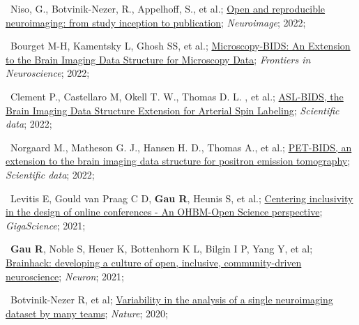 

\textbullet~Niso, G., Botvinik-Nezer, R., Appelhoff, S., et al.;
\href{https://doi.org/10.1016/j.neuroimage.2022.119623}
{Open and reproducible neuroimaging: from study inception to publication};
\textit{Neuroimage};
2022;

\textbullet~Bourget M-H, Kamentsky L, Ghosh SS, et al.;
\href{https://doi.org/10.3389/fnins.2022.871228}
{Microscopy-BIDS: An Extension to the Brain Imaging Data Structure for Microscopy Data};
\textit{Frontiers in Neuroscience};
2022;
\newline
{}

\textbullet~Clement P., Castellaro M, Okell T. W., Thomas D. L. , et al.;
\href{https://doi.org/10.1038/s41597-022-01615-9}
{ASL-BIDS, the Brain Imaging Data Structure Extension for Arterial Spin Labeling};
\textit{Scientific data};
2022;

\textbullet~Norgaard M., Matheson G. J., Hansen H. D., Thomas A., et al.;
\href{https://doi.org/10.1038/s41597-022-01164-1}
{PET-BIDS, an extension to the brain imaging data structure for positron emission tomography};
\textit{Scientific data};
2022;

\textbullet~Levitis E, Gould van Praag C D, \textbf{Gau R}, Heunis S, et al.;
\href{https://doi.org/10.1093/gigascience/giab051}
{Centering inclusivity in the design of online conferences - An OHBM-Open Science perspective};
\textit{GigaScience};
2021;
\newline
{}

\textbullet~\textbf{Gau R}, Noble S, Heuer K, Bottenhorn K L, Bilgin I P, Yang Y, et al;
\href{https://doi.org/10.1016/j.neuron.2021.04.001}{Brainhack: developing a culture of open, inclusive, community-driven neuroscience};
\textit{Neuron};
2021;

\textbullet~Botvinik-Nezer R, et al;
\href{https://osf.io/zac8t/}{Variability in the analysis of a single neuroimaging dataset by many teams};
\textit{Nature};
2020;


